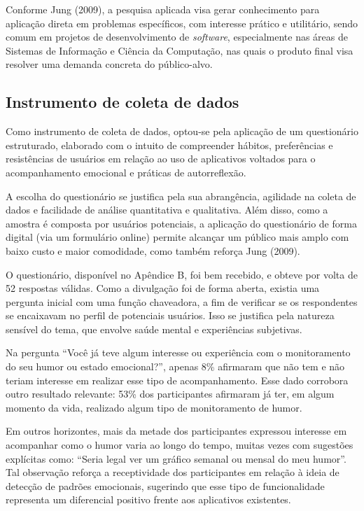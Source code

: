 Conforme Jung (2009), a pesquisa aplicada visa gerar conhecimento para
aplicação direta em problemas específicos, com interesse prático e utilitário,
sendo comum em projetos de desenvolvimento de \textit{software}, especialmente
nas áreas de Sistemas de Informação e Ciência da Computação, nas quais o
produto final visa resolver uma demanda concreta do público-alvo.

\subsection{Instrumento de coleta de dados}

Como instrumento de coleta de dados, optou-se pela aplicação de um questionário
estruturado, elaborado com o intuito de compreender hábitos, preferências e
resistências de usuários em relação ao uso de aplicativos voltados para o
acompanhamento emocional e práticas de autorreflexão.

A escolha do questionário se justifica pela sua abrangência, agilidade na
coleta de dados e facilidade de análise quantitativa e qualitativa. Além disso,
como a amostra é composta por usuários potenciais, a aplicação do questionário
de forma digital (via um formulário online) permite alcançar um público mais
amplo com baixo custo e maior comodidade, como também reforça Jung (2009).

O questionário, disponível no Apêndice B, foi bem recebido, e obteve por volta
de 52 respostas válidas. Como a divulgação foi de forma aberta, existia uma
pergunta inicial com uma função chaveadora, a fim de verificar se os
respondentes se encaixavam no perfil de potenciais usuários. Isso se justifica
pela natureza sensível do tema, que envolve saúde mental e experiências
subjetivas.

Na pergunta ``Você já teve algum interesse ou experiência com o monitoramento do
seu humor ou estado emocional?'', apenas 8\% afirmaram que não tem e não teriam
interesse em realizar esse tipo de acompanhamento. Esse dado corrobora outro
resultado relevante: 53\% dos participantes afirmaram já ter, em algum momento
da vida, realizado algum tipo de monitoramento de humor.

Em outros horizontes, mais da metade dos participantes expressou interesse em
acompanhar como o humor varia ao longo do tempo, muitas vezes com sugestões
explícitas como: “Seria legal ver um gráfico semanal ou mensal do meu humor”.
Tal observação reforça a receptividade dos participantes em relação à ideia de
detecção de padrões emocionais, sugerindo que esse tipo de funcionalidade
representa um diferencial positivo frente aos aplicativos existentes.

